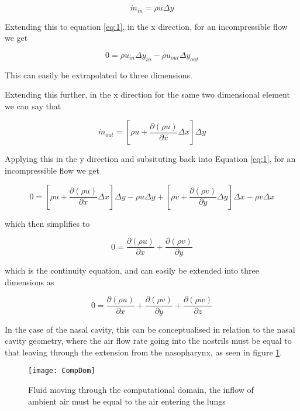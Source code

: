     \begin{equation} \label{eq:2}
      \dot{m}_{in} = \rho u \Delta y
     \end{equation}

    Extending this to equation \ref{eq:1}, in the x direction, for an incompressible flow we get

    \begin{equation} \label{eq:3}
      0 = \rho u_{in} \Delta y_{in} - \rho u_{out} \Delta y_{out}
    \end{equation}

    This can easily be extrapolated to three dimensions.


Extending this further, in the x direction for the same two dimensional element we can say that

\begin{equation} \label{eq:22}
\dot{m}_{out} = [\rho u + \frac{\partial(\rho u)}{\partial x}\Delta x]\Delta y
\end{equation}

Applying this in the y direction and subsituting back into Equation \ref{eq:1}, for an incompressible flow we get
 
\begin{dmath} \label{eq:23}
0 = [\rho u + \frac{\partial(\rho u)}{\partial x}\Delta x]\Delta y - \rho u \Delta y 
+ [\rho v + \frac{\partial(\rho v)}{\partial y}\Delta y]\Delta x - \rho v \Delta x  
\end{dmath}

which then simplifies to

\begin{equation} \label{eq:24}
  0 = \frac{\partial(\rho u)}{\partial x} + \frac{\partial(\rho v)}{\partial y}
\end{equation}

which is the continuity equation, and can easily be extended into three dimensions as

\begin{equation} \label{eq:25}
  0 = \frac{\partial(\rho u)}{\partial x} + \frac{\partial(\rho v)}{\partial y} + \frac{\partial(\rho w)}{\partial z}
\end{equation}


    In the case of the nasal cavity, this can be conceptualised in relation to the nasal cavity geometry, where the air flow rate going into the nostrils must be equal to that leaving through the extension from the nasopharynx, as seen in figure \ref{fig:CompDom}.

\begin{figure}   
  \centering
  \texttt{[image: CompDom]}
  \caption{Fluid moving through the computational domain, the inflow of ambient air must be equal to the air entering the lungs}
  \label{fig:CompDom}
\end{figure}

